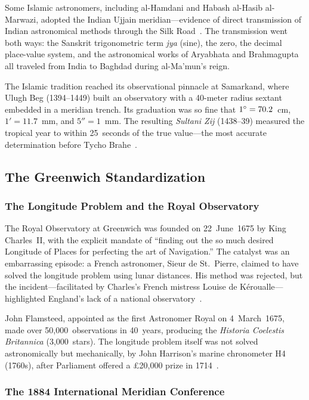 \documentclass[10pt,a4paper]{article}
\begin{document}
Some Islamic astronomers, including al-Hamdani and Habash al-Hasib
al-Marwazi, adopted the Indian Ujjain meridian---evidence of direct
transmission of Indian astronomical methods through the Silk
Road~\cite{pingree1970}. The transmission went both ways: the Sanskrit
trigonometric term \textit{jya} (sine), the zero, the decimal place-value
system, and the astronomical works of Aryabhata and Brahmagupta all traveled
from India to Baghdad during al-Ma'mun's reign.

The Islamic tradition reached its observational pinnacle at Samarkand, where
Ulugh Beg (1394--1449) built an observatory with a 40-meter radius sextant
embedded in a meridian trench. Its graduation was so fine that
$1\degree = 70.2$~cm, $1' = 11.7$~mm, and $5'' = 1$~mm. The resulting
\textit{Sultani Zij} (1438--39) measured the tropical year to within
25~seconds of the true value---the most accurate determination before
Tycho Brahe~\cite{sayili1960}.

\subsection{The Greenwich Standardization}
\label{subsec:greenwich}

\subsubsection{The Longitude Problem and the Royal Observatory}

The Royal Observatory at Greenwich was founded on 22~June~1675 by King
Charles~II, with the explicit mandate of ``finding out the so much desired
Longitude of Places for perfecting the art of Navigation.'' The catalyst
was an embarrassing episode: a French astronomer, Sieur de St.~Pierre,
claimed to have solved the longitude problem using lunar distances. His
method was rejected, but the incident---facilitated by Charles's French
mistress Louise de K\'{e}roualle---highlighted England's lack of a national
observatory~\cite{sobel1995}.

John Flamsteed, appointed as the first Astronomer Royal on 4~March~1675,
made over 50,000~observations in 40~years, producing the
\textit{Historia Coelestis Britannica} (3,000~stars). The longitude
problem itself was not solved astronomically but mechanically, by John
Harrison's marine chronometer H4 (1760s), after Parliament offered a
\pounds 20,000 prize in 1714~\cite{sobel1995}.

\subsubsection{The 1884 International Meridian Conference}
\end{document}
